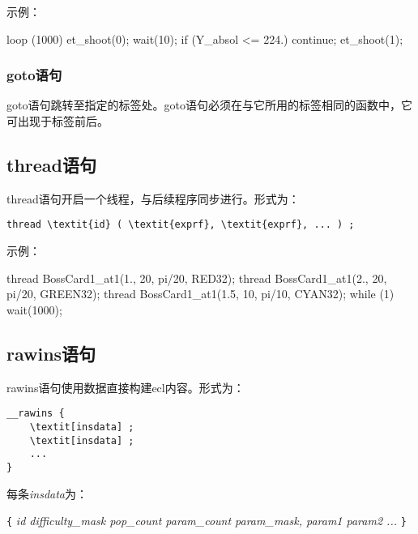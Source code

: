 \documentclass[UTF8]{ctexart}
\begin{document}
示例：

\begin{MUAvbt}
loop (1000) {
	et_shoot(0);
	wait(10);
	if (Y_absol <= 224.)
		continue;
	et_shoot(1);
}
\end{MUAvbt}

\subsubsection{goto语句}

goto语句跳转至指定的标签处。goto语句必须在与它所用的标签相同的函数中，它可出现于标签前后。

\subsection{thread语句}

thread语句开启一个线程，与后续程序同步进行。形式为：

\begin{Verbatim}[frame=single, rulecolor=\color{magenta}, commandchars=\\\{\}]
thread \textit{id} ( \textit{exprf}, \textit{exprf}, ... ) ;
\end{Verbatim}

示例：

\begin{MUAvbt}
thread BossCard1_at1(1., 20, pi/20, RED32);
thread BossCard1_at1(2., 20, pi/20, GREEN32);
thread BossCard1_at1(1.5, 10, pi/10, CYAN32);
while (1) wait(1000);
\end{MUAvbt}

\subsection{rawins语句}

rawins语句使用数据直接构建ecl内容。形式为：

\begin{Verbatim}[frame=single, rulecolor=\color{magenta}, commandchars=\\\[\]]
__rawins {
	\textit[insdata] ;
	\textit[insdata] ;
	...
}
\end{Verbatim}

每条\textit{insdata}为：

\verb|{| \textit{id difficulty\_mask pop\_count param\_count param\_mask, param1 param2 ...} \verb|}|
\end{document}
